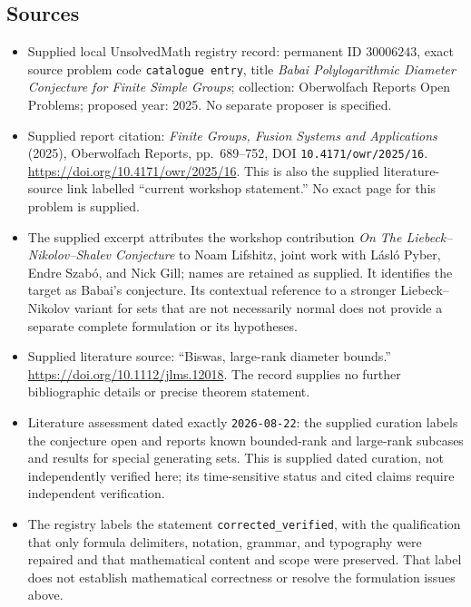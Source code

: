 \documentclass[11pt]{article}
\begin{document}
\subsection{Sources}
\begin{itemize}
\item Supplied local UnsolvedMath registry record: permanent ID \(30006243\), exact source problem code \texttt{catalogue entry}, title \emph{Babai Polylogarithmic Diameter Conjecture for Finite Simple Groups}; collection: Oberwolfach Reports Open Problems; proposed year: 2025. No separate proposer is specified.
\item Supplied report citation: \emph{Finite Groups, Fusion Systems and Applications} (2025), Oberwolfach Reports, pp.~689--752, DOI \texttt{10.4171/owr/2025/16}. \url{https://doi.org/10.4171/owr/2025/16}. This is also the supplied literature-source link labelled ``current workshop statement.'' No exact page for this problem is supplied.
\item The supplied excerpt attributes the workshop contribution \emph{On The Liebeck--Nikolov--Shalev Conjecture} to Noam Lifshitz, joint work with Lásló Pyber, Endre Szabó, and Nick Gill; names are retained as supplied. It identifies the target as Babai's conjecture. Its contextual reference to a stronger Liebeck--Nikolov variant for sets that are not necessarily normal does not provide a separate complete formulation or its hypotheses.
\item Supplied literature source: ``Biswas, large-rank diameter bounds.'' \url{https://doi.org/10.1112/jlms.12018}. The record supplies no further bibliographic details or precise theorem statement.
\item Literature assessment dated exactly \texttt{2026-08-22}: the supplied curation labels the conjecture open and reports known bounded-rank and large-rank subcases and results for special generating sets. This is supplied dated curation, not independently verified here; its time-sensitive status and cited claims require independent verification.
\item The registry labels the statement \texttt{corrected\_verified}, with the qualification that only formula delimiters, notation, grammar, and typography were repaired and that mathematical content and scope were preserved. That label does not establish mathematical correctness or resolve the formulation issues above.
\end{itemize}
\end{document}
